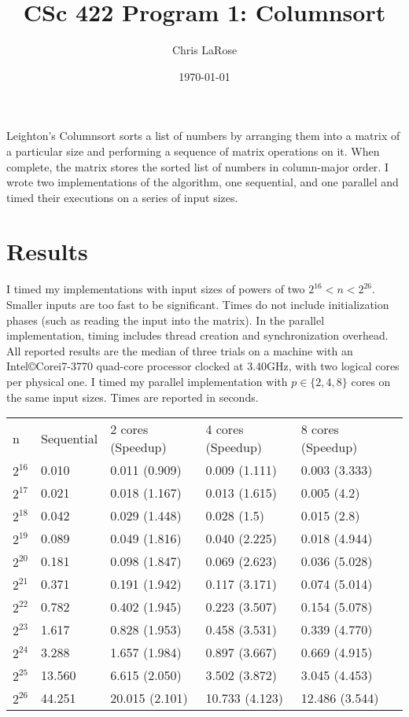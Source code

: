 \documentclass[a4paper]{article}
\title{CSc 422 Program 1: Columnsort}
\author{Chris LaRose}
\date{\today}
\begin{document}
\maketitle


Leighton's Columnsort\cite{leighton} sorts a list of numbers by arranging them into a matrix of a particular size and performing a sequence of matrix operations on it. When complete, the matrix stores the sorted list of numbers in column-major order. I wrote two implementations of the algorithm, one sequential, and one parallel and timed their executions on a series of input sizes.

\section{Results}

I timed my implementations with input sizes of powers of two $2^{16} < n < 2^{26}$. Smaller inputs are too fast to be significant. Times do not include initialization phases (such as reading the input into the matrix). In the parallel implementation, timing includes thread creation and synchronization overhead. All reported results are the median of three trials on a machine with an Intel\copyright Core\texttrademark i7-3770 quad-core processor clocked at 3.40GHz, with two logical cores per physical one. I timed my parallel implementation with $p \in \{2,4,8\}$ cores on the same input sizes. Times are reported in seconds.

\begin{tabular}{ l l l l l l }
  n & Sequential & 2 cores (Speedup) & 4 cores (Speedup) & 8 cores (Speedup) \\  
  $2^{16}$ & 0.010 & 0.011 (0.909) & 0.009 (1.111) & 0.003 (3.333) \\
  $2^{17}$ & 0.021 & 0.018 (1.167) & 0.013 (1.615) & 0.005 (4.2)   \\
  $2^{18}$ & 0.042 & 0.029 (1.448) & 0.028 (1.5)   & 0.015 (2.8)   \\
  $2^{19}$ & 0.089 & 0.049 (1.816) & 0.040 (2.225) & 0.018 (4.944) \\
  $2^{20}$ & 0.181 & 0.098 (1.847) & 0.069 (2.623) & 0.036 (5.028) \\
  $2^{21}$ & 0.371 & 0.191 (1.942) & 0.117 (3.171) & 0.074 (5.014) \\
  $2^{22}$ & 0.782 & 0.402 (1.945) & 0.223 (3.507) & 0.154 (5.078) \\
  $2^{23}$ & 1.617 & 0.828 (1.953) & 0.458 (3.531) & 0.339 (4.770) \\
  $2^{24}$ & 3.288 & 1.657 (1.984) & 0.897 (3.667) & 0.669 (4.915) \\
  $2^{25}$ & 13.560 & 6.615 (2.050)  & 3.502 (3.872)  & 3.045 (4.453)  \\
  $2^{26}$ & 44.251 & 20.015 (2.101) & 10.733 (4.123) & 12.486 (3.544) \\
\end{tabular}
\end{document}
